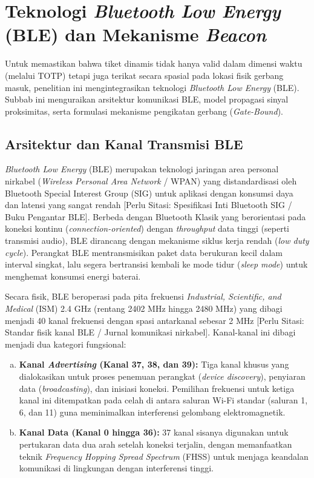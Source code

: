 \section{Teknologi \textit{Bluetooth Low Energy} (BLE) dan Mekanisme \textit{Beacon}}
\label{sec:ble_beacon}

Untuk memastikan bahwa tiket dinamis tidak hanya valid dalam dimensi waktu (melalui TOTP) tetapi juga terikat secara spasial pada lokasi fisik gerbang masuk, penelitian ini mengintegrasikan teknologi \textit{Bluetooth Low Energy} (BLE). Subbab ini menguraikan arsitektur komunikasi BLE, model propagasi sinyal proksimitas, serta formulasi mekanisme pengikatan gerbang (\textit{Gate-Bound}).

\subsection{Arsitektur dan Kanal Transmisi BLE}
\textit{Bluetooth Low Energy} (BLE) merupakan teknologi jaringan area personal nirkabel (\textit{Wireless Personal Area Network} / WPAN) yang distandardisasi oleh Bluetooth Special Interest Group (SIG) untuk aplikasi dengan konsumsi daya dan latensi yang sangat rendah [Perlu Sitasi: Spesifikasi Inti Bluetooth SIG / Buku Pengantar BLE]. Berbeda dengan Bluetooth Klasik yang berorientasi pada koneksi kontinu (\textit{connection-oriented}) dengan \textit{throughput} data tinggi (seperti transmisi audio), BLE dirancang dengan mekanisme siklus kerja rendah (\textit{low duty cycle}). Perangkat BLE mentransmisikan paket data berukuran kecil dalam interval singkat, lalu segera bertransisi kembali ke mode tidur (\textit{sleep mode}) untuk menghemat konsumsi energi baterai.

Secara fisik, BLE beroperasi pada pita frekuensi \textit{Industrial, Scientific, and Medical} (ISM) 2.4 GHz (rentang 2402 MHz hingga 2480 MHz) yang dibagi menjadi 40 kanal frekuensi dengan spasi antarkanal sebesar 2 MHz [Perlu Sitasi: Standar fisik kanal BLE / Jurnal komunikasi nirkabel]. Kanal-kanal ini dibagi menjadi dua kategori fungsional:
\begin{enumerate}[a)]
    \item \textbf{Kanal \textit{Advertising} (Kanal 37, 38, dan 39):} Tiga kanal khusus yang dialokasikan untuk proses penemuan perangkat (\textit{device discovery}), penyiaran data (\textit{broadcasting}), dan inisiasi koneksi. Pemilihan frekuensi untuk ketiga kanal ini ditempatkan pada celah di antara saluran Wi-Fi standar (saluran 1, 6, dan 11) guna meminimalkan interferensi gelombang elektromagnetik.
    \item \textbf{Kanal Data (Kanal 0 hingga 36):} 37 kanal sisanya digunakan untuk pertukaran data dua arah setelah koneksi terjalin, dengan memanfaatkan teknik \textit{Frequency Hopping Spread Spectrum} (FHSS) untuk menjaga keandalan komunikasi di lingkungan dengan interferensi tinggi.
\end{enumerate}

